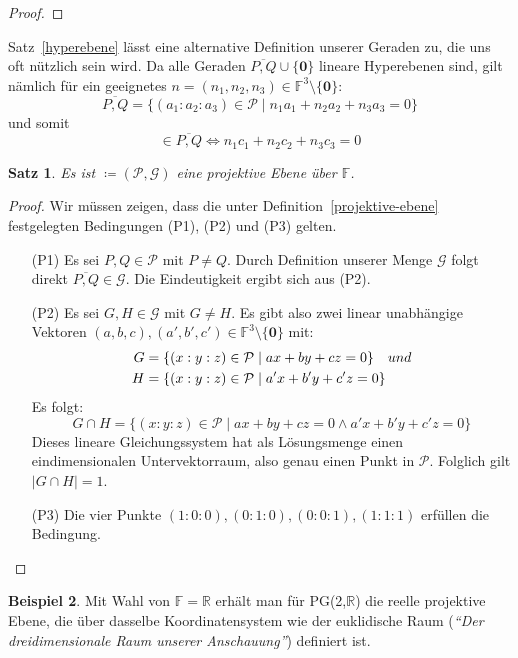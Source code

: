\documentclass[hidelinks]{article}
\theoremstyle{plain}
\newtheorem{thm}{Satz}[section]
\theoremstyle{definition}
\newtheorem{bsp}[thm]{Beispiel}
\theoremstyle{rem}
\newcommand{\pgtwo}{PG(2, $\mathbb{F}$)\ }
\newcommand{\ftnz}{\mathbb{F}^{3}\setminus\{\boldsymbol 0\}}
\begin{document}
\begin{sloppypar}
\begin{proof}
\end{proof}
Satz~\ref{hyperebene} lässt eine alternative Definition unserer Geraden zu, die uns oft nützlich sein wird. Da alle Geraden $\overline{P,Q}\cup\{\boldsymbol 0\}$ lineare Hyperebenen sind, gilt nämlich für ein geeignetes \mbox{$n=(n_1,n_2,n_3)\in\ftnz$}:
\begin{equation*}
	\overline{P,Q}=\{(a_1:a_2:a_3)\in\mathcal{P}\mid n_1a_1+n_2a_2+n_3a_3=0\}
\end{equation*}
und somit
\begin{equation*}
	[c]\in\overline{P,Q}\Leftrightarrow n_1c_1+n_2c_2+n_3c_3=0
\end{equation*}

\begin{thm}
	Es ist \normalfont{\pgtwo}$\coloneqq(\mathcal{P},\mathcal{G})$ eine projektive Ebene über $\mathbb{F}$.
\end{thm}
\begin{proof}
	Wir müssen zeigen, dass die unter Definition~\ref{projektive-ebene} festgelegten Bedingungen (P1), (P2) und (P3) gelten.
\begin{enumerate}
	\item[(P1)] Es sei $P,Q\in\mathcal{P}$ mit $P\ne Q$. Durch Definition unserer Menge $\mathcal{G}$ folgt direkt $\overline{P,Q}\in\mathcal{G}$.
	Die Eindeutigkeit ergibt sich aus (P2).
	\item[(P2)] Es sei $G,H\in\mathcal{G}$ mit $G\ne H$. Es gibt also zwei linear unabhängige Vektoren $(a,b,c),(a',b',c')\in\ftnz$ mit:
	\begin{align*}
	G & = \{(x:y:z)\in\mathcal{P}\mid ax+by+cz=0\}\quad\normalfont{und}\\
	H & =\{(x:y:z)\in\mathcal{P}\mid a'x+b'y+c'z=0\}
	\end{align*}
	Es folgt:
	\begin{equation*}
		G\cap H=\{(x:y:z)\in\mathcal{P}\mid ax+by+cz=0\land a'x+b'y+c'z=0\}
	\end{equation*}
	Dieses lineare Gleichungssystem hat als Lösungsmenge einen eindimensionalen Untervektorraum, also genau einen Punkt in $\mathcal{P}$. Folglich gilt $|G\cap H|=1$.
	\item[(P3)] Die vier Punkte $(1:0:0),(0:1:0),(0:0:1),(1:1:1)$ erfüllen die Bedingung.
	\vspace{-2em}
\end{enumerate}
\end{proof}
\begin{bsp}
Mit Wahl von $\mathbb{F}=\mathbb{R}$ erhält man für PG(2,$\mathbb{R}$) die reelle projektive Ebene, die über dasselbe Koordinatensystem wie der euklidische Raum (\textit{``Der dreidimensionale Raum unserer Anschauung''}) definiert ist.\\

\end{bsp}
\end{sloppypar}
\end{document}
